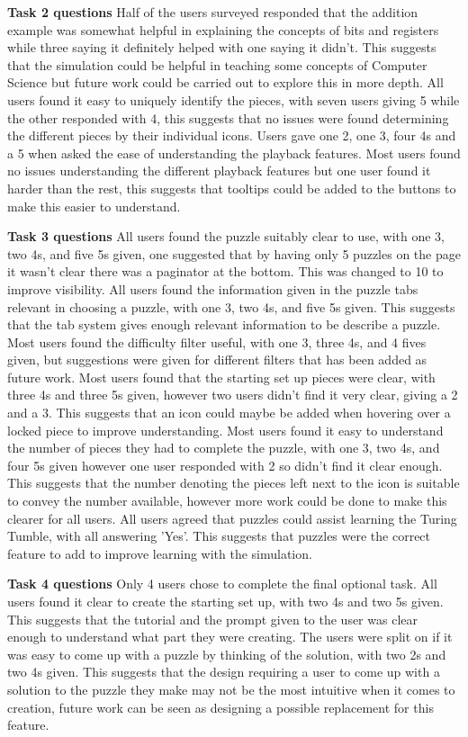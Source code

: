 \documentclass{l4proj}
\begin{document}
\textbf{Task 2 questions}
Half of the users surveyed responded that the addition example was somewhat helpful in explaining the concepts of bits and registers while three saying it definitely helped with one saying it didn't. This suggests that the simulation could be helpful in teaching some concepts of Computer Science but future work could be carried out to explore this in more depth. All users found it easy to uniquely identify the pieces, with seven users giving 5 while the other responded with 4, this suggests that no issues were found determining the different pieces by their individual icons. Users gave one 2, one 3, four 4s and a 5 when asked the ease of understanding the playback features. Most users found no issues understanding the different playback features but one user found it harder than the rest, this suggests that tooltips could be added to the buttons to make this easier to understand.   

\textbf{Task 3 questions}
All users found the puzzle suitably clear to use, with one 3, two 4s, and five 5s given, one suggested that by having only 5 puzzles on the page it wasn't clear there was a paginator at the bottom. This was changed to 10 to improve visibility. All users found the information given in the puzzle tabs relevant in choosing a puzzle, with one 3, two 4s, and five 5s given. This suggests that the tab system gives enough relevant information to be describe a puzzle. Most users found the difficulty filter useful, with one 3, three 4s, and 4 fives given, but suggestions were given for different filters that has been added as future work. Most users found that the starting set up pieces were clear, with three 4s and three 5s given, however two users didn't find it very clear, giving a 2 and a 3. This suggests that an icon could maybe be added when hovering over a locked piece to improve understanding. Most users found it easy to understand the number of pieces they had to complete the puzzle, with one 3, two 4s, and four 5s given however one user responded with 2 so didn't find it clear enough. This suggests that the number denoting the pieces left next to the icon is suitable to convey the number available, however more work could be done to make this clearer for all users. All users agreed that puzzles could assist learning the Turing Tumble, with all answering 'Yes'. This suggests that puzzles were the correct feature to add to improve learning with the simulation.

\textbf{Task 4 questions}
Only 4 users chose to complete the final optional task. All users found it clear to create the starting set up, with two 4s and two 5s given. This suggests that the tutorial and the prompt given to the user was clear enough to understand what part they were creating. The users were split on if it was easy to come up with a puzzle by thinking of the solution, with two 2s and two 4s given. This suggests that the design requiring a user to come up with a solution to the puzzle they make may not be the most intuitive when it comes to creation, future work can be seen as designing a possible replacement for this feature.
\end{document}
